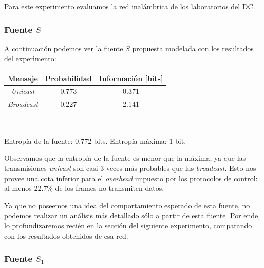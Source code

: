 \par Para este experimento evaluamos la red inalámbrica de los laboratorios del DC.

\subsubsection{Fuente $S$}

\par A continuación podemos ver la fuente $S$ propuesta modelada con los resultados del experimento: \\

\begin{tabular}{ | c | c | c |}
    \hline
    Mensaje & Probabilidad & Información [bits] \\
    \hline
    \textit{Unicast} & 0.773 & 0.371 \\
    \hline
    \textit{Broadcast} & 0.227 & 2.141 \\
    \hline
\end{tabular} \\

\par Entropía de la fuente: 0.772 bits. Entropía máxima: 1 bit.

\par Observamos que la entropía de la fuente es menor que la máxima, ya que las transmisiones \textit{unicast} son casi 3 veces más probables que las \textit{broadcast}.
Esto nos provee una cota inferior para el \textit{overhead} impuesto por los protocolos de control: al menos 22.7\% de los frames no transmiten datos.

\par Ya que no poseemos una idea del comportamiento esperado de esta fuente, no podemos realizar un análisis más detallado sólo a partir de esta fuente.
Por ende, lo profundizaremos recién en la sección del siguiente experimento, comparando con los resultados obtenidos de esa red.


\subsubsection{Fuente $S_1$}

